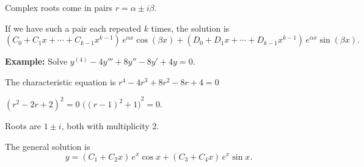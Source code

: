 \documentclass[10pt,aspectratio=169]{beamer}
\begin{document}
\begin{frame}
Complex roots come in pairs $r = \alpha \pm i \beta$.

\medskip
\pause

If we have such a pair each repeated $k$ times,
the solution is
\[
( C_0 + C_1 x + \cdots + C_{k-1} x^{k-1} ) \, e^{\alpha x} \cos (\beta x)
+
( D_0 + D_1 x + \cdots + D_{k-1} x^{k-1} ) \, e^{\alpha x} \sin (\beta x) .
\]


\textbf{Example:}
Solve
\quad
$y^{(4)} - 4 y''' + 8 y'' - 8 y' + 4y = 0$.

\medskip
\pause

The characteristic equation is
\quad
$r^4 - 4 r^3 + 8 r^2 - 8 r + 4 = 0$

\pause
\thus
\quad
${(r^2-2r+2)}^2 = 0$
\pause
\wthus
${\bigl({(r-1)}^2+1\bigr)}^2 = 0$.

\medskip
\pause

Roots are $1 \pm i$, both with multiplicity $2$.

\medskip
\pause

The general solution is
\[
y = 
( C_1 + C_2 x ) \, e^{x} \cos x
+
( C_3 + C_4 x ) \, e^{x} \sin x .
\]
\end{frame}
\end{document}
